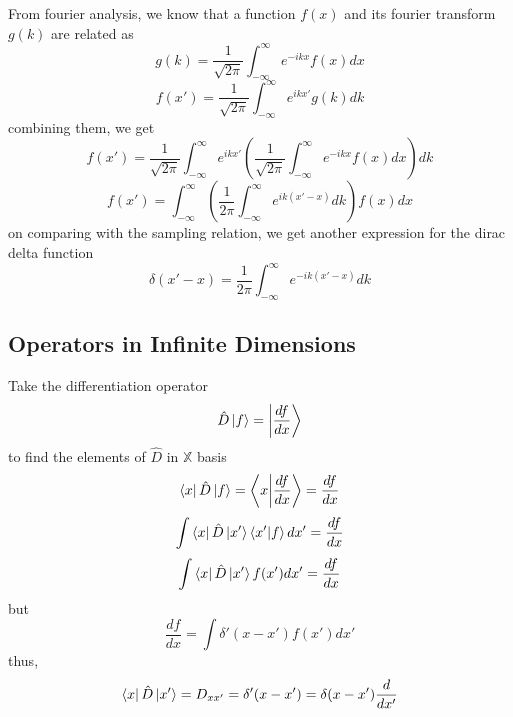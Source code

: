 \documentclass[12pt,a4paper]{report}
\newcommand{\vecspace}[1]{\mathbb{#1}}
\newcommand{\der}[2]{\frac{d#1}{d#2}}
\begin{document}
From fourier analysis, we know that a function $f(x)$ and its fourier transform $g(k)$ are related as
\begin{equation*}
    g(k) = \frac{1}{\sqrt{2\pi}} \int_{-\infty}^{\infty} e^{-ikx} f(x) dx
\end{equation*}
\begin{equation*}
    f(x') = \frac{1}{\sqrt{2\pi}} \int_{-\infty}^{\infty} e^{ikx'} g(k) dk
\end{equation*}
combining them, we get
\begin{equation*}
    f(x') = \frac{1}{\sqrt{2\pi}} \int_{-\infty}^{\infty} e^{ikx'} \left( \frac{1}{\sqrt{2\pi}} \int_{-\infty}^{\infty} e^{-ikx} f(x) dx \right) dk
\end{equation*}
\begin{equation*}
    f(x') = \int_{-\infty}^{\infty} \left( \frac{1}{2\pi} \int_{-\infty}^{\infty} e^{ik(x'-x)} dk \right) f(x) dx
\end{equation*}
on comparing with the sampling relation, we get another expression for the dirac delta function
\begin{equation*}
    \delta(x'-x) = \frac{1}{2\pi}\int_{-\infty}^{\infty}e^{-ik(x'-x)} dk
\end{equation*}

\subsection{Operators in Infinite Dimensions}

Take the differentiation operator
\begin{equation*}
    \hat{D}\ket{f} = \ket{\der{f}{x}}
\end{equation*}
to find the elements of $\hat{D}$ in $\vecspace{X}$ basis
\begin{equation*}
    \bra{x}\hat{D}\ket{f} = \bra{x}\ket{\der{f}{x}} = \der{f}{x}
\end{equation*}
\begin{equation*}
    \int \bra{x}\hat{D}\ket{x'}\bra{x'}\ket{f} dx' = \der{f}{x}
\end{equation*}
\begin{equation*}
    \int \bra{x}\hat{D}\ket{x'}f(x') dx' = \der{f}{x}
\end{equation*}
but
\begin{equation*}
    \der{f}{x} = \int \delta'(x-x')f(x') dx'
\end{equation*}
thus,
\begin{equation*}
    \bra{x}\hat{D}\ket{x'} = D_{xx'} = \delta'(x-x') = \delta(x-x') \der{}{x'}
\end{equation*}
\end{document}
